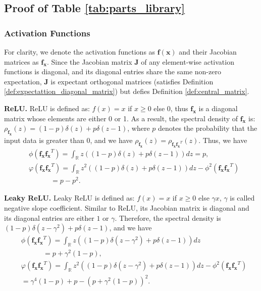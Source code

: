 \documentclass[10pt,journal,compsoc]{IEEEtran}
\begin{document}
 \subsection{Proof of Table \ref{tab:parts_library}}\label{proof:part_library}
\subsubsection{Activation Functions}
For clarity, we denote the activation functions as $\mathbf{f}(\mathbf{x})$ and their Jacobian matrices as $\mathbf{f_x}$. Since the Jacobian matrix $\mathbf{J}$ of any element-wise activation functions is diagonal, and its diagonal entries share the same non-zero expectation, $\mathbf{J}$ is expectant orthogonal matrices (satisfies Definition \ref{def:expectattion_diagonal_matrix}) but defies Definition \ref{def:central_matrix}.

\textbf{ReLU.} ReLU is defined as: $f(x)=x$ if $x\ge0$ else $0$, thus $\mathbf{f_x}$ is a diagonal matrix whose elements are either 0 or 1. As a result, the spectral density of $\mathbf{f_x}$ is: $\rho_{\mathbf{f_x}}(z) = (1-p)\delta(z)+p\delta(z-1)$, where $p$ denotes the probability that the input data is greater than 0, and we have $\rho_{\mathbf{f_x}}(z) = \rho_{\mathbf{f_xf_x}^T}(z)$. Thus, we have
\begin{equation}
    \begin{split}
        &\phi(\mathbf{f_xf_x}^T) = \int_{\mathbb{R}}z\left((1-p)\delta(z)+p\delta(z-1)\right)dz = p,\\
        &\varphi(\mathbf{f_xf_x}^T) = \int_{\mathbb{R}}z^2\left((1-p)\delta(z)+p\delta(z-1)\right)dz - \phi^2(\mathbf{f_xf_x}^T)\\
        &~~~~~~~~~~~~~~ = p - p^2.
    \end{split}
\label{equ:eig_relu}
\end{equation}

\textbf{Leaky ReLU. }Leaky ReLU is defined as: $f(x)=x$ if $x\ge0$ else $\gamma x$, $\gamma$ is called negative slope coefficient. Similar to ReLU, its Jacobian matrix is diagonal and its diagonal entries are either $1$ or $\gamma$. Therefore, the spectral density is $(1-p)\delta(z-\gamma^2) + p\delta(z-1)$, and we have
\begin{equation}
    \begin{split}
        &\phi(\mathbf{f_xf_x}^T) = \int_{\mathbb{R}}z\left((1-p)\delta(z-\gamma^2)+p\delta(z-1)\right)dz\\
        &~~~~~~~~~~~~~~ = p + \gamma^2(1-p),\\
        &\varphi(\mathbf{f_xf_x}^T)\! =\! \int_{\mathbb{R}}z^2\!\left((1\!-\!p)\delta(z\!-\!\gamma^2)\!+\!p\delta(z\!-\!1)\right)dz\! -\! \phi^2(\mathbf{f_xf_x}^T)\\
        & = \gamma^4(1-p)+p - (p+\gamma^2(1-p))^2.
    \end{split}
\label{equ:eig_prelu}
\end{equation}
\end{document}
